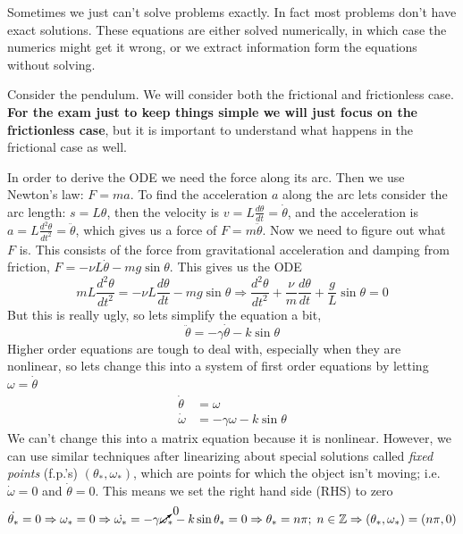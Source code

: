 \documentclass[reqno]{amsart}
\theoremstyle{definition}
\begin{document}
Sometimes we just can't solve problems exactly.  In fact most problems don't have exact solutions.
These equations are either solved numerically, in which case the numerics might get it wrong, or
we extract information form the equations without solving.

Consider the pendulum.  We will consider both the frictional and frictionless case.  \textbf{For the exam
just to keep things simple we will just focus on the frictionless case}, but it is important to understand
what happens in the frictional case as well.

In order to derive the ODE we need the force along its arc.  Then we use Newton's law: $F = ma$.
To find the acceleration $a$ along the arc lets consider the arc length: $s = L\theta$, then
the velocity is $v = L\frac{d\theta}{dt} = \dot{\theta}$, and the acceleration is
$a = L\frac{d^2\theta}{dt^2} = \ddot{\theta}$, which gives us a force of $F = m\ddot{\theta}$.
Now we need to figure out what $F$ is.  This consists of the force from gravitational acceleration
and damping from friction, $F = -\nu L\dot{\theta} - mg\sin\theta$.  This gives us the ODE
%
\begin{equation*}
mL\frac{d^2\theta}{dt^2} = -\nu L\frac{d\theta}{dt} - mg\sin\theta
\Rightarrow \frac{d^2\theta}{dt^2} + \frac{\nu}{m}\frac{d\theta}{dt} + \frac{g}{L}\sin\theta = 0
\end{equation*}
%
But this is really ugly, so lets simplify the equation a bit,
%
\begin{equation}
\ddot{\theta} = -\gamma \dot{\theta} - k\sin\theta
\end{equation}
%
Higher order equations are tough to deal with, especially when they are nonlinear, so lets
change this into a system of first order equations by letting $\omega = \dot{\theta}$
%
\begin{equation*}
\begin{split}
\dot{\theta} &= \omega\\
\dot{\omega} &= -\gamma\omega - k\sin\theta
\end{split}
\end{equation*}
%
We can't change this into a matrix equation because it is nonlinear.  However, we can use similar
techniques after linearizing about special solutions called \emph{fixed points} (f.p.'s) $(\theta_*,\omega_*)$, which
are points for which the object isn't moving; i.e. $\dot{\omega} = 0$ and $\dot{\theta} = 0$.
This means we set the right hand side (RHS) to zero
%
\begin{equation*}
\dot{\theta_*} = 0 \Rightarrow \omega_* = 0 \Rightarrow \dot{\omega_*} = -\gamma\cancelto{0}{\omega}_*
-k\sin\theta_* = 0 \Rightarrow \theta_* = n\pi;\; n\in \mathbb{Z} \Rightarrow (\theta_*,\omega_*) = (n\pi,0)
\end{equation*}
\end{document}
